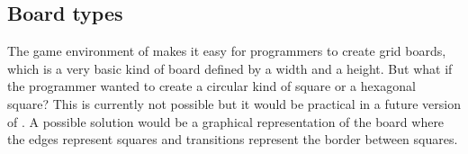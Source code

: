 \subsection{Board types}
\label{sec:boardtypes}

The game environment of \productname{} makes it easy for programmers to create grid boards, which is a
very basic kind of board defined by a width and a height. But what if the programmer wanted to create a
circular kind of square or a hexagonal square? This is currently not possible but it would be practical 
in a future version of \productname{}. A possible solution would be a graphical representation of the board where
the edges represent squares and transitions represent the border between squares.
   